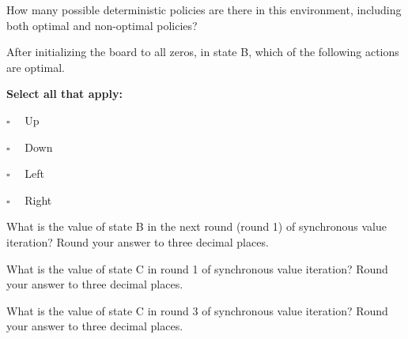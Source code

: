 \documentclass[11pt,addpoints,answers]{exam}
\newcommand{\emptysquare}{{\LARGE $\square$}\ \ }
\newcommand{\filledsquare}{{\LARGE $\boxtimes$}\ \ }
\begin{document}
    
\begin{questions}
    \question[1] How many possible deterministic policies are there in this environment, including both optimal and non-optimal policies?
    
    \begin{your_solution}[title=Answer,height=1.8cm,width=3cm]
    \end{your_solution}
    
    \question[1] After initializing the board to all zeros, in state B, which of the following actions are optimal.
    
    \textbf{Select all that apply:}
    \begin{list}{}
        \item 
            \emptysquare 
            Up
        \item 
            \emptysquare
            Down
        \item
            \emptysquare
            Left
        \item
            \emptysquare
            Right
    \end{list}
    
    
    \question[1] What is the value of state B in the next round (round 1) of synchronous value iteration? Round your answer to three decimal places.
    
    \begin{your_solution}[title = Answer, height=2cm,width=3cm]
    \end{your_solution}
    
    \question[1] What is the value of state C in round 1 of synchronous value iteration?  Round your answer to three decimal places.
    
    \begin{your_solution}[title = Answer, height=2cm,width=3cm]
    \end{your_solution}
    
    \question[1] What is the value of state C in round 3 of synchronous value iteration?  Round your answer to three decimal places.
    
    \begin{your_solution}[title = Answer, height=2cm,width=3cm]
    \end{your_solution}
    

\end{questions}
\end{document}
